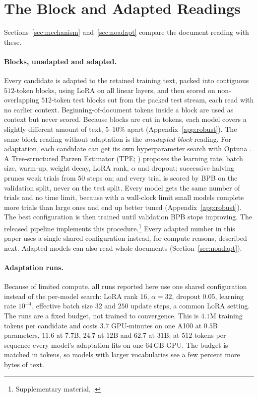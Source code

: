 \documentclass[10pt]{article}
\newcommand{\repourl}{https://github.com/DavidAfonsoValente/entropy-bench}
\newcommand{\repolink}[1]{\expandafter\url\expandafter{\detokenize\expandafter{\repourl#1}}}
\newcommand{\artifact}[1]{\footnote{Supplementary material, \texttt{\detokenize{#1}}.}}
\newcommand{\artifact}[1]{\footnote{\repolink{/tree/main/#1}}}
\begin{document}
\section{The Block and Adapted Readings}
\label{app:readings}
Sections~\ref{sec:mechanism} and~\ref{sec:noadapt} compare the document reading with these.

\paragraph{Blocks, unadapted and adapted.} Every candidate is adapted to the retained training text,
packed into contiguous $512$-token blocks, using LoRA \citep{hu2022lora} on all linear layers, and
then scored on non-overlapping $512$-token test blocks cut from the packed test stream, each read
with no earlier context. Beginning-of-document tokens inside a block are used as context but never
scored. Because blocks are cut in tokens, each model covers a slightly different amount of text,
$5$--$10\%$ apart (Appendix~\ref{app:robust}). The same block reading without adaptation is the
\emph{unadapted block} reading. For adaptation, each candidate can get its own hyperparameter search with Optuna \citep{akiba2019optuna}.
A Tree-structured Parzen Estimator (TPE; \citealp{bergstra2011tpe}) proposes the learning rate,
batch size, warm-up, weight decay, LoRA rank, $\alpha$ and dropout; successive halving
\citep{jamieson2016successive} prunes weak trials from $50$ steps on; and every trial is scored by
BPB on the validation split, never on the test split. Every model gets the same number of trials
and no time limit, because with a wall-clock limit small models complete more trials than large
ones and end up better tuned (Appendix~\ref{app:robust}). The best configuration is then trained
until validation BPB stops improving. The released pipeline implements this
procedure.\artifact{lm_adapt_bench} Every
adapted number in this paper uses a single shared configuration instead, for compute reasons,
described next. Adapted models can also read whole documents (Section~\ref{sec:noadapt}).

\paragraph{Adaptation runs.} Because of limited compute, all runs reported here use one shared
configuration instead of the per-model search: LoRA rank 16, $\alpha{=}32$, dropout $0.05$, learning
rate $10^{-4}$, effective batch size 32 and $250$ update steps, a common LoRA setting. The runs are a
fixed budget, not trained to convergence. This is $4.1$M training tokens per candidate and costs
$3.7$ GPU-minutes on one A100 at $0.5$B parameters, $11.6$ at $7.7$B, $24.7$ at $12$B and $62.7$ at
$31$B; at $512$ tokens per sequence every model's adaptation fits on one 64\,GB GPU. The budget is
matched in tokens, so models with larger vocabularies see a few percent more bytes of text.
\end{document}
